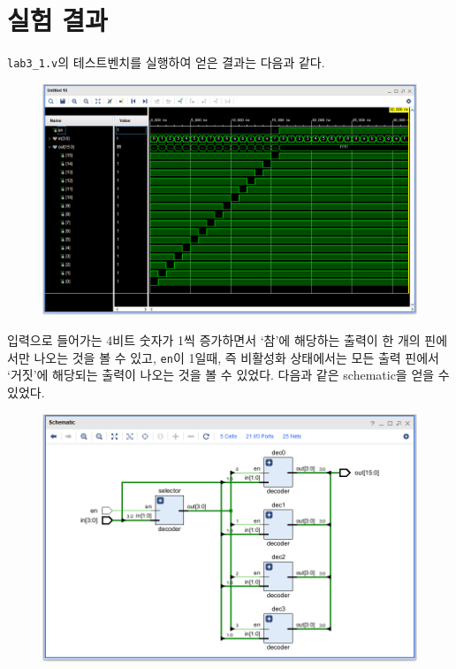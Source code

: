 \documentclass{scrartcl}
\begin{document}
\section{실험 결과}
\texttt{lab3\_1.v}의 테스트벤치를 실행하여 얻은 결과는 다음과 같다.
\begin{figure}[H]
  \centering
  \includegraphics[width=\linewidth]{lab3_1_waveform}
\end{figure}
입력으로 들어가는 4비트 숫자가 1씩 증가하면서 `참'에 해당하는 출력이 한 개의 핀에서만 나오는 것을 볼 수 있고, \texttt{en}이 1일때, 즉 비활성화 상태에서는 모든 출력 핀에서 `거짓'에 해당되는 출력이 나오는 것을 볼 수 있었다.
다음과 같은 schematic을 얻을 수 있었다.
\begin{figure}[H]
  \centering
  \includegraphics[width=\linewidth]{lab3_1_schematic}
\end{figure}
\end{document}
